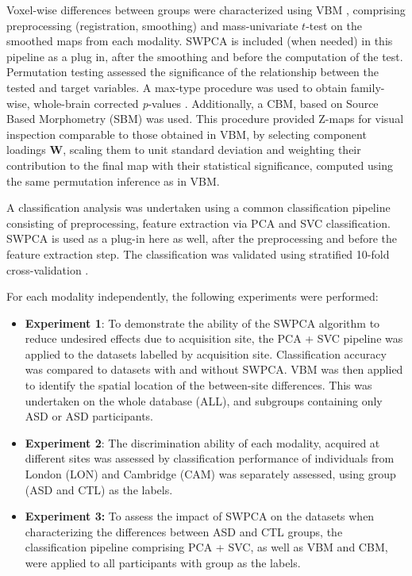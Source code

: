 Voxel-wise differences between groups were characterized using \acf{VBM} \cite{Ashburner2000}, comprising preprocessing (registration, smoothing) and mass-univariate $t$-test on the smoothed maps from each modality. \ac{SWPCA} is included (when needed) in this pipeline as a plug in, after the smoothing and before the computation of the test. Permutation testing assessed the significance of the relationship between the tested and target variables. A max-type procedure was used to obtain family-wise, whole-brain corrected \textit{p}{}-values \cite{Freedman1983}. Additionally, a \acf{CBM}, based on Source Based Morphometry (SBM) \cite{Xu2009} was used. This procedure provided Z-maps for visual inspection comparable to those obtained in \ac{VBM}, by selecting component loadings $\mathbf{W}$, scaling them to unit standard deviation and weighting their contribution to the final map with their statistical significance, computed using the same permutation inference as in \ac{VBM}. 

A classification analysis was undertaken using a common classification pipeline \cite{Khedher2015} consisting of preprocessing, feature extraction via \ac{PCA} and \ac{SVC} classification. \ac{SWPCA} is used as a plug-in here as well, after the preprocessing and before the feature extraction step. The classification was validated using stratified 10-fold cross-va\-li\-da\-tion \cite{Kohavi1995}. 

For each modality independently, the following experiments were performed: 
\begin{itemize}
	\item \textbf{Experiment 1}: To demonstrate the ability of the \ac{SWPCA} algorithm	to reduce undesired effects due to acquisition site, the \ac{PCA} + \ac{SVC} pipeline was applied to the datasets labelled by acquisition site. Classification accuracy was compared to datasets with and without \ac{SWPCA}. \ac{VBM} was then applied to identify the spatial location of the between-site differences. This was undertaken on the whole database (ALL), and subgroups containing only \ac{ASD} or \ac{ASD} participants. 
	
	\item \textbf{Experiment 2}: The discrimination ability of each modality, acquired at different sites was assessed by classification performance of individuals from London (LON) and Cambridge (CAM) was separately assessed, using group (\ac{ASD} and \ac{CTL}) as the labels. 
	
	\item \textbf{Experiment 3:} To assess the impact of \ac{SWPCA} on the datasets when characterizing the differences between \ac{ASD} and \ac{CTL} groups, the classification pipeline comprising \ac{PCA} + \ac{SVC}, as well as \ac{VBM} and \ac{CBM}, were applied to all participants with group as the labels.
	
\end{itemize}

